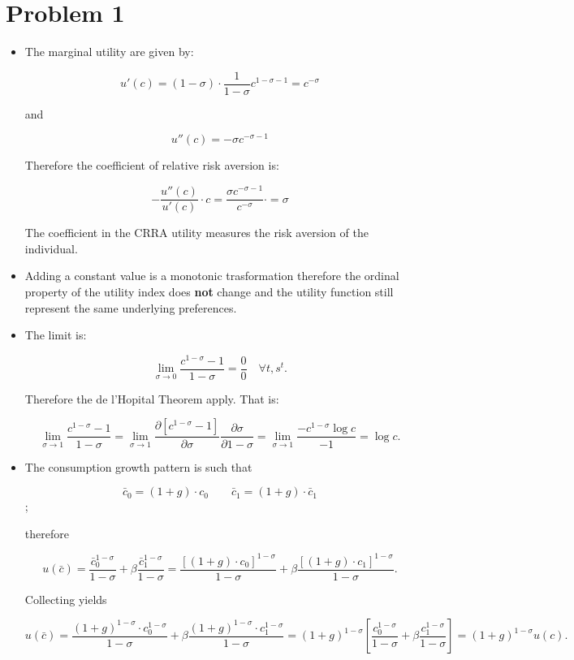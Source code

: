 \documentclass[12pt,a4paper]{article}
\begin{document}
\section*{Problem 1}

\begin{itemize}
  \item The marginal utility are given by:

      $$ u'(c) = (1-\sigma) \cdot \frac{1}{1-\sigma} c^{1-\sigma - 1} = c^{-\sigma} $$

    and

      $$ u''(c) = -\sigma c^{-\sigma -1}$$

    Therefore the coefficient of relative risk aversion is:

      $$ -\frac{u''(c)}{u'(c)}\cdot c = \frac{\sigma c^{-\sigma -1}}{c^{-\sigma}} \cdot = \sigma $$

    The coefficient in the CRRA utility measures the risk aversion of the individual.

  \item Adding a constant value is a monotonic trasformation therefore the ordinal property of the utility index does \textbf{not} change and the utility function still represent the same underlying preferences.

  \item The limit is:

    $$ \lim_{\sigma \to 0} \frac{c^{1-\sigma} - 1}{1-\sigma} = \frac{0}{0} \quad \forall t, s^t.$$

  Therefore the de l'Hopital Theorem apply. That is:

    $$\lim_{\sigma \to 1} \frac{c^{1-\sigma} - 1}{1-\sigma} = \lim_{\sigma \to 1} \frac{\partial [c^{1-\sigma} - 1]}{\partial \sigma} \frac{\partial \sigma}{\partial 1-\sigma} = \lim_{\sigma \to 1} \frac{- c^{1-\sigma} \log c}{-1} = \log c.$$

  \item The consumption growth pattern is such that

    $$  \bar{c}_0 = (1 + g) \cdot c_0 \qquad \bar{c}_1 = (1 + g) \cdot \bar{c}_1 $$;

  therefore

    $$  u(\bar{c}) = \frac{\bar{c}_0^{1 - \sigma}}{1 - \sigma} + \beta \frac{\bar{c}_1^{1 - \sigma}}{1 - \sigma} = \frac{[(1 + g) \cdot c_0]^{1-\sigma}}{1-\sigma} + \beta \frac{[(1 + g) \cdot c_1]^{1-\sigma}}{1-\sigma}. $$

  Collecting yields

  $$  u(\bar{c}) = \frac{(1 + g)^{1-\sigma} \cdot c_0^{1-\sigma}}{1-\sigma} + \beta \frac{(1 + g)^{1-\sigma} \cdot c_1^{1-\sigma}}{1-\sigma} = (1 + g)^{1-\sigma} \left[  \frac{c_0^{1 - \sigma}}{1 - \sigma} + \beta \frac{c_1^{1 - \sigma}}{1 - \sigma} \right] = (1 + g)^{1-\sigma} u(c).$$
  

\end{itemize}
\end{document}
